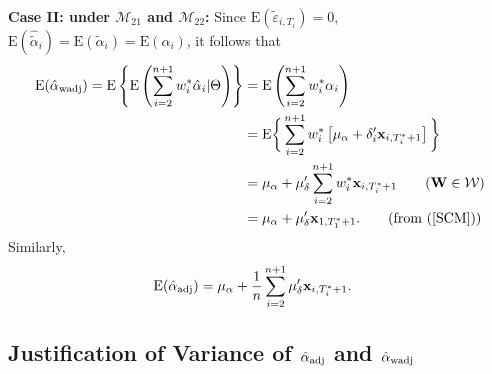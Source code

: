 \documentclass[11pt]{article}
\def\mbf#1{\mathbf{#1}} %
\def\mrm#1{\mathrm{#1}} %
\def\mc#1{\mathcal{#1}} %
\def\E#1{\mathrm{E}(#1)} %
\theoremstyle{definition}
\begin{document}
\noindent \textbf{Case II: under $\mc{M}_{21}$ and $\mc{M}_{22}$:} Since $\E{\tilde{\varepsilon}_{i, T_i}}=0$, $\E{\hat{\tilde{\alpha}}_{i}}=\E{\tilde{\alpha}_{i}}=\E{\alpha_{i}}$, it follows that
  \begin{align*}
   \E{\hat{\alpha}_{\rm wadj}}= \mrm{E}\left\{\mrm{E}\left(\sum_{i=2}^{n+1} w_i^*\hat{\alpha}_i|\Theta\right)\right\}
   &= \mrm{E}\left( \sum_{i=2}^{n+1} w_i^*\alpha_i\right)\\
   &= \mrm{E}\bigg\{ \sum_{i=2}^{n+1} w_i^*\left[\mu_{\alpha}+\delta_{i}'\mbf{x}_{i, T_i^*+1}\right]\bigg\}\\
   &=\mu_{\alpha}+ \mu_{\delta}' \sum_{i=2}^{n+1} w_i^*\mbf{x}_{i, T_i^*+1}\tag{$\mbf{W}\in \mc{W}$}
   \\
   &=\mu_{\alpha}+  \mu_{\delta}'\mbf{x}_{1, T_1^*+1}. \tag{from (\ref{SCM})}
   \end{align*}
Similarly,
  \begin{align*}
   \E{\hat{\alpha}_{\rm adj}}
   &=\mu_{\alpha}+\frac{1}{n}\sum_{i=2}^{n+1} \mu_{\delta}'  \mbf{x}_{i, T_i^*+1}.
   \end{align*}


\subsection{Justification of Variance of $\hat{\alpha}_{\rm adj}$ and $\hat{\alpha}_{\rm wadj}$}
\label{var}
\end{document}
